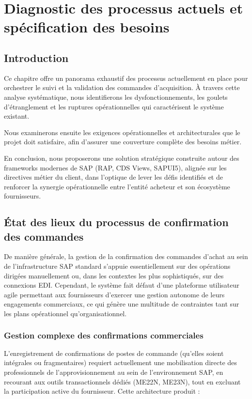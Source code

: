 \documentclass[12pt,a4paper,oneside]{report}
\begin{document}
\chapter{Diagnostic des processus actuels et sp\'ecification des besoins}\label{ch:etude-analyse}
\section{Introduction}\label{ch3:introduction}

Ce chapitre offre un panorama exhaustif des processus actuellement en place pour orchestrer le suivi et la validation des commandes d'acquisition. À travers cette analyse systématique, nous identifierons les dysfonctionnements, les goulets d'étranglement et les ruptures opérationnelles qui caractérisent le système existant.

Nous examinerons ensuite les exigences opérationnelles et architecturales que le projet doit satisfaire, afin d'assurer une couverture complète des besoins métier.

En conclusion, nous proposerons une solution stratégique construite autour des frameworks modernes de SAP (RAP, CDS Views, SAPUI5), alignée sur les directives métier du client, dans l'optique de lever les défis identifiés et de renforcer la synergie opérationnelle entre l'entité acheteur et son écosystème fournisseurs.

\section{\'Etat des lieux du processus de confirmation des commandes}\label{ch3:analyse}

De manière générale, la gestion de la confirmation des commandes d'achat au sein de l'infrastructure SAP standard s'appuie essentiellement sur des opérations dirigées manuellement ou, dans les contextes les plus sophistiqués, sur des connexions EDI. Cependant, le système fait défaut d'une plateforme utilisateur agile permettant aux fournisseurs d'exercer une gestion autonome de leurs engagements commerciaux, ce qui génère une multitude de contraintes tant sur les plans opérationnel qu'organisationnel.

\subsection{Gestion complexe des confirmations commerciales}\label{ch3:confirmation}

L'enregistrement de confirmations de postes de commande (qu'elles soient intégrales ou fragmentaires) requiert actuellement une mobilisation directe des professionnels de l'approvisionnement au sein de l'environnement SAP, en recourant aux outils transactionnels dédiés (ME22N, ME23N), tout en excluant la participation active du fournisseur. Cette architecture produit :
\end{document}
